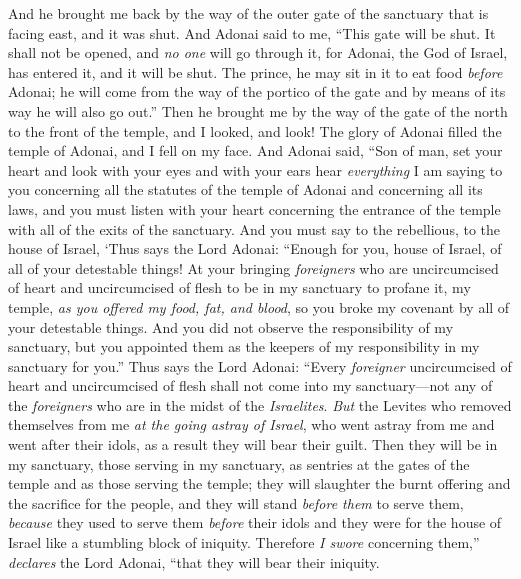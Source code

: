 \begin{biblechapter} %
 And he brought me back by the way of the outer gate of the sanctuary that is facing east, and it was shut.
\verse And Adonai said to me, “This gate will be shut. It shall not be opened, and \textit{no one} will go through it, for Adonai, the God of Israel, has entered it, and it will be shut.
\verse The prince, he may sit in it to eat food \textit{before} Adonai; he will come from the way of the portico of the gate and by means of its way he will also go out.”
\verse Then he brought me by the way of the gate of the north to the front of the temple, and I looked, and look! The glory of Adonai filled the temple of Adonai, and I fell on my face.
\verse And Adonai said, “Son of man, set your heart and look with your eyes and with your ears hear \textit{everything} I am saying to you concerning all the statutes of the temple of Adonai and concerning all its laws, and you must listen with your heart concerning the entrance of the temple with all of the exits of the sanctuary.
\verse And you must say to the rebellious, to the house of Israel, ‘Thus says the Lord Adonai: “Enough for you, house of Israel, of all of your detestable things!
\verse At your bringing \textit{foreigners} who are uncircumcised of heart and uncircumcised of flesh to be in my sanctuary to profane it, my temple, \textit{as you offered my food, fat, and blood}, so you broke my covenant by all of your detestable things.
\verse And you did not observe the responsibility of my sanctuary, but you appointed them as the keepers of my responsibility in my sanctuary for you.”
\verse Thus says the Lord Adonai: “Every \textit{foreigner} uncircumcised of heart and uncircumcised of flesh shall not come into my sanctuary—not any of the \textit{foreigners} who are in the midst of the \textit{Israelites}.
\verse \textit{But} the Levites who removed themselves from me \textit{at the going astray of Israel}, who went astray from me and went after their idols, as a result they will bear their guilt.
\verse Then they will be in my sanctuary, those serving in my sanctuary, as sentries at the gates of the temple and as those serving the temple; they will slaughter the burnt offering and the sacrifice for the people, and they will stand \textit{before them} to serve them,
\verse \textit{because} they used to serve them \textit{before} their idols and they were for the house of Israel like a stumbling block of iniquity. Therefore \textit{I swore} concerning them,” \textit{declares} the Lord Adonai, “that they will bear their iniquity.

\end{biblechapter}
